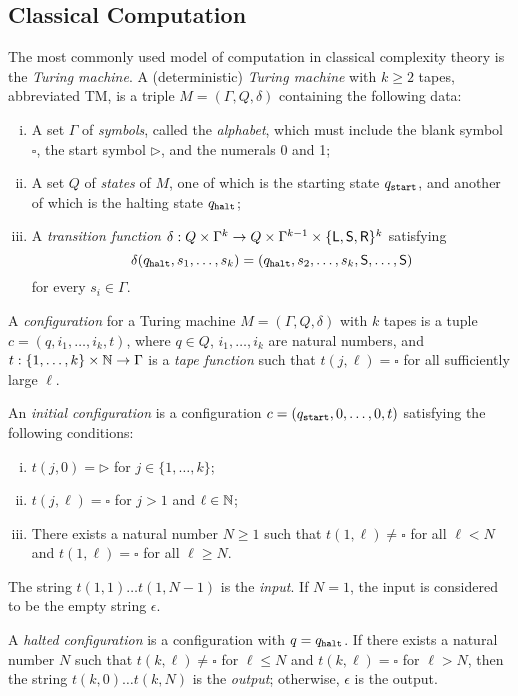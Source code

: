\subsection{Classical Computation} \label{classical-models}

The most commonly used model of computation in classical complexity theory is
the \textit{Turing machine}. A (deterministic) \textit{Turing machine} with
$k\geq 2$ tapes, abbreviated TM, is a triple $M=(\Gamma, Q, \delta)$ containing 
the following data:
\begin{enumerate}[(i)]
\item A set $\Gamma$ of \textit{symbols}, called the \textit{alphabet}, which
  must include the blank symbol $\square$, the start symbol $\triangleright$,
  and the numerals 0 and 1;
\item A set $Q$ of \textit{states} of $M$, one of which is the starting state
  $q_{\mathtt{start}}$, and another of which is the halting state $q_{\mathtt{halt}}$;
\item A \textit{transition function} $\delta:Q\times\Gamma^k\rightarrow
  Q\times\Gamma^{k-1}\times\{\mathsf{L},\mathsf{S},\mathsf{R}\}^k$ satisfying
  \[
  \delta(q_{\mathtt{halt}},s_1,\ldots,s_k)= (q_{\mathtt{halt}},s_2,\ldots,s_k,\mathsf{S},\ldots,\mathsf{S})
  \]
  for every $s_i\in\Gamma$.
\end{enumerate}

A \textit{configuration} for a Turing machine $M=(\Gamma, Q, \delta)$ with $k$
tapes is a tuple $c=(q,i_1,\ldots,i_k,t)$, where $q\in Q$, $i_1,\ldots,i_k$ are
natural numbers, and $t:\{1,\ldots,k\}\times\mathbb{N}\rightarrow\Gamma$ is a \textit{tape
function} such that $t(j,\ell)=\square$ for all sufficiently large $\ell$.

An \textit{initial configuration} is a configuration $c=(q_{\mathtt{start}},0,\ldots,0,t)$
satisfying the following conditions:
\begin{enumerate}[(i)]
\item $t(j,0)=\triangleright$ for $j\in\{1,\ldots,k\}$;
\item $t(j,\ell)=\square$ for $j>1$ and $\ell\in\mathbb{N}$;
\item There exists a natural number $N\geq 1$ such that $t(1,\ell)\neq\square$
  for all $\ell<N$ and $t(1,\ell)=\square$ for all $\ell\geq N$.
\end{enumerate}
The string $t(1,1)\ldots t(1,N-1)$ is the \textit{input}. If $N=1$, the input is
considered to be the empty string $\epsilon$.

A \textit{halted configuration} is a configuration with $q=q_{\mathtt{halt}}$. If there
exists a natural number $N$ such that $t(k,\ell)\neq\square$ for $\ell\leq N$
and $t(k,\ell)=\square$ for $\ell>N$, then the string $t(k,0)\ldots t(k,N)$ is
the \textit{output}; otherwise, $\epsilon$ is the output.

